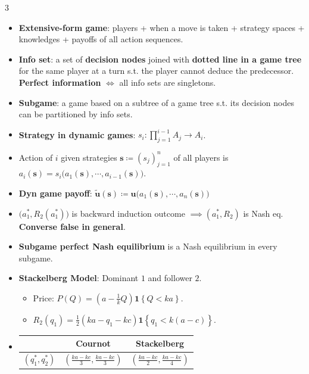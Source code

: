 \documentclass[8pt]{article}
\begin{document}
\begin{multicols*}{3}
\begin{itemize}
            \item \textbf{Extensive-form game}: players + when a move is taken + strategy spaces + knowledges + payoffs of all action sequences.
            \item \textbf{Info set}: a set of \textbf{decision nodes} joined with \textbf{dotted line in a game tree} for the same player at a turn s.t. the player cannot deduce the predecessor. \textbf{Perfect information} $\iff$ all info sets are singletons.      
            \item \textbf{Subgame}: a game based on a subtree of a game tree s.t. its decision nodes can be partitioned by info sets.
            \item \textbf{Strategy in dynamic games}: $s_i \colon \prod_{j = 1}^{i - 1}A_j \to A_i$.
            \item Action of $i$ given strategies $\bm{s} \coloneqq \left(s_j\right)_{j = 1}^n$ of all players is $a_i\left(\bm{s}\right) = s_i\bigl(a_1\left(\bm{s}\right), \cdots, a_{i - 1}\left(\bm{s}\right)\bigr)$.
            \item \textbf{Dyn game payoff}: $\tilde{\bm{u}}\left(\bm{s}\right) \coloneqq \bm{u}\bigl(a_1\left(\bm{s}\right), \cdots, a_n\left(\bm{s}\right)\bigr)$
            \item $\bigl(a_1^*, R_2\left(a_1^*\right)\bigr)$ is backward induction outcome $\implies \left(a_1^*, R_2\right)$ is Nash eq. \textbf{Converse false in general}.
            \item \textbf{Subgame perfect Nash equilibrium} is a Nash equilibrium in every subgame.
            \item \textbf{Stackelberg Model}: Dominant $1$ and follower $2$.
            \begin{itemize}
                \setlength\itemsep{0pt}
                \item Price: $P\left(Q\right) = \left(a - \frac{1}{k}Q\right)\mathbf{1}\left\{Q < ka\right\}$.
                \item $R_2\left(q_1\right) = \frac{1}{2}\left(ka - q_1 - kc\right)\mathbf{1}\left\{q_1 < k\left(a - c\right)\right\}$.
            \end{itemize}
            \item \begin{tabular}{|c|c|c|}
                \hline 
                & Cournot & Stackelberg \\
                \hline
                $\left(q_1^*, q_2^*\right)$ & $\left(\frac{ka - kc}{3}, \frac{ka - kc}{3}\right)$ & $\left(\frac{ka - kc}{2}, \frac{ka - kc}{4}\right)$ \\

\end{tabular}
\end{itemize}
\end{multicols*}
\end{document}
